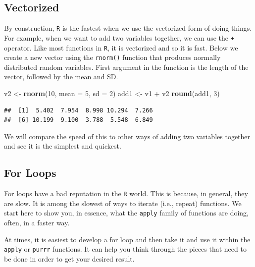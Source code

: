 \documentclass[]{tufte-book}
\newenvironment{Shaded}{}{}
\newcommand{\KeywordTok}[1]{\textcolor[rgb]{0.00,0.44,0.13}{\textbf{#1}}}
\newcommand{\DataTypeTok}[1]{\textcolor[rgb]{0.56,0.13,0.00}{#1}}
\newcommand{\DecValTok}[1]{\textcolor[rgb]{0.25,0.63,0.44}{#1}}
\newcommand{\StringTok}[1]{\textcolor[rgb]{0.25,0.44,0.63}{#1}}
\newcommand{\OperatorTok}[1]{\textcolor[rgb]{0.40,0.40,0.40}{#1}}
\newcommand{\NormalTok}[1]{#1}
\theoremstyle{definition}
\theoremstyle{definition}
\theoremstyle{remark}
\begin{document}
\subsection*{Vectorized}\label{vectorized}

By construction, \texttt{R} is the fastest when we use the vectorized
form of doing things. For example, when we want to add two variables
together, we can use the \texttt{+} operator. Like most functions in
\texttt{R}, it is vectorized and so it is fast. Below we create a new
vector using the \texttt{rnorm()} function that produces normally
distributed random variables. First argument in the function is the
length of the vector, followed by the mean and SD.

\begin{Shaded}
\begin{Highlighting}[]
\NormalTok{v2 <-}\StringTok{ }\KeywordTok{rnorm}\NormalTok{(}\DecValTok{10}\NormalTok{, }\DataTypeTok{mean =} \DecValTok{5}\NormalTok{, }\DataTypeTok{sd =} \DecValTok{2}\NormalTok{)}
\NormalTok{add1 <-}\StringTok{ }\NormalTok{v1 }\OperatorTok{+}\StringTok{ }\NormalTok{v2}
\KeywordTok{round}\NormalTok{(add1, }\DecValTok{3}\NormalTok{)}
\end{Highlighting}
\end{Shaded}

\begin{verbatim}
##  [1]  5.402  7.954  8.998 10.294  7.266
##  [6] 10.199  9.100  3.788  5.548  6.849
\end{verbatim}

We will compare the speed of this to other ways of adding two variables
together and see it is the simplest and quickest.

\subsection*{For Loops}\label{for-loops}

For loops have a bad reputation in the \texttt{R} world. This is
because, in general, they are slow. It is among the slowest of ways to
iterate (i.e., repeat) functions. We start here to show you, in essence,
what the \texttt{apply} family of functions are doing, often, in a
faster way.

At times, it is easiest to develop a for loop and then take it and use
it within the \texttt{apply} or \texttt{purrr} functions. It can help
you think through the pieces that need to be done in order to get your
desired result.
\end{document}

